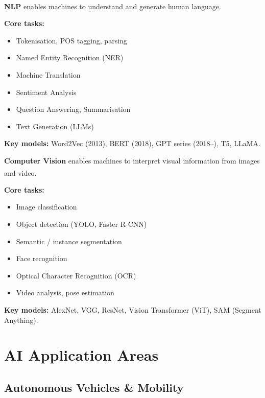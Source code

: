     \begin{tcbitemize}[ skin=sectionraster ]
        \tcbitem[title=Natural Language Processing, raster multicolumn=3]
        \textbf{NLP} enables machines to understand and generate human language.\textsuperscript{\cite{adjaouteAI2024}}

        \textbf{Core tasks:}
        \begin{itemize}
            \item Tokenisation, POS tagging, parsing
            \item Named Entity Recognition (NER)
            \item Machine Translation
            \item Sentiment Analysis
            \item Question Answering, Summarisation
            \item Text Generation (LLMs)
        \end{itemize}

        \textbf{Key models:} Word2Vec (2013), BERT (2018), GPT series (2018--), T5, LLaMA.

        \tcbitem[title=Computer Vision, raster multicolumn=3]
        \textbf{Computer Vision} enables machines to interpret visual information from images and video.\textsuperscript{\cite{adjaouteAI2024}}

        \textbf{Core tasks:}
        \begin{itemize}
            \item Image classification
            \item Object detection (YOLO, Faster R-CNN)
            \item Semantic / instance segmentation
            \item Face recognition
            \item Optical Character Recognition (OCR)
            \item Video analysis, pose estimation
        \end{itemize}

        \textbf{Key models:} AlexNet, VGG, ResNet, Vision Transformer (ViT), SAM (Segment Anything).
    \end{tcbitemize}

    \section{AI Application Areas}
    \subsection{Autonomous Vehicles \& Mobility}

